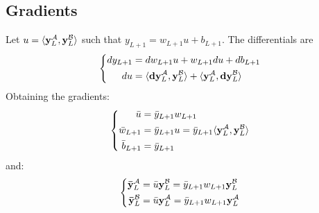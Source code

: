 \begin{subappendices}

\section{Gradients}

Let $u = \langle \boldsymbol{\mathbf{y}}_{L}^{\mathcal{A}}, \boldsymbol{\mathbf{y}}_{L}^{\mathcal{B}} \rangle$ such that $y_{L+1} = w_{L+1} u + b_{L+1}$.
The differentials are
\begin{equation}
\left\{ \begin{aligned}
dy_{L+1} & = dw_{L+1} u + w_{L+1} du + db_{L+1} \\
du & = \langle \boldsymbol{\mathbf{dy}}_{L}^{\mathcal{A}}, \boldsymbol{\mathbf{y}}_{L}^{\mathcal{B}} \rangle + \langle \boldsymbol{\mathbf{y}}_{L}^{\mathcal{A}}, \boldsymbol{\mathbf{dy}}_{L}^{\mathcal{B}} \rangle
\end{aligned} \right.
\end{equation}
Obtaining the gradients:
\begin{equation}
\left\{ \begin{aligned}
\bar{u} & = \bar{y}_{L+1} w_{L+1} \\
\bar{w}_{L+1} & = \bar{y}_{L+1} u = \bar{y}_{L+1} \langle \boldsymbol{\mathbf{y}}_{L}^{\mathcal{A}}, \boldsymbol{\mathbf{y}}_{L}^{\mathcal{B}} \rangle \\
\bar{b}_{L+1} & = \bar{y}_{L+1}
\end{aligned} \right.
\end{equation}
and:
\begin{equation}
\left\{ \begin{aligned}
\boldsymbol{\mathbf{\bar{y}}}_{L}^{\mathcal{A}} & = \bar{u} \boldsymbol{\mathbf{y}}_{L}^{\mathcal{B}} = \bar{y}_{L+1} w_{L+1} \boldsymbol{\mathbf{y}}_{L}^{\mathcal{B}} \\
\boldsymbol{\mathbf{\bar{y}}}_{L}^{\mathcal{B}} & = \bar{u} \boldsymbol{\mathbf{y}}_{L}^{\mathcal{A}} = \bar{y}_{L+1} w_{L+1} \boldsymbol{\mathbf{y}}_{L}^{\mathcal{A}}
\end{aligned} \right.
\end{equation}

\end{subappendices}
